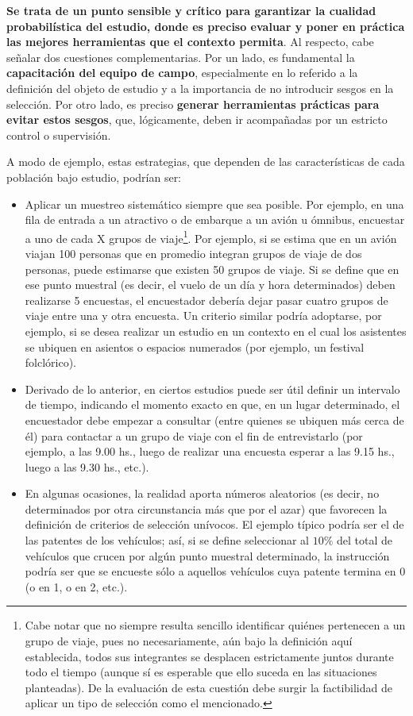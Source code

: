 \documentclass[
]{book}
\begin{document}
\textbf{Se trata de un punto sensible y crítico para garantizar la cualidad probabilística del estudio, donde es preciso evaluar y poner en práctica las mejores herramientas que el contexto permita}. Al respecto, cabe señalar dos cuestiones complementarias. Por un lado, es fundamental la \textbf{capacitación del equipo de campo}, especialmente en lo referido a la definición del objeto de estudio y a la importancia de no introducir sesgos en la selección. Por otro lado, es preciso \textbf{generar herramientas prácticas para evitar estos sesgos}, que, lógicamente, deben ir acompañadas por un estricto control o supervisión.

A modo de ejemplo, estas estrategias, que dependen de las características de cada población bajo estudio, podrían ser:

\begin{itemize}
\item
  Aplicar un muestreo sistemático siempre que sea posible. Por ejemplo, en una fila de entrada a un atractivo o de embarque a un avión u ómnibus, encuestar a uno de cada X grupos de viaje\footnote{Cabe notar que no siempre resulta sencillo identificar quiénes pertenecen a un grupo de viaje, pues no necesariamente, aún bajo la definición aquí establecida, todos sus integrantes se desplacen estrictamente juntos durante todo el tiempo (aunque sí es esperable que ello suceda en las situaciones planteadas). De la evaluación de esta cuestión debe surgir la factibilidad de aplicar un tipo de selección como el mencionado.}. Por ejemplo, si se estima que en un avión viajan 100 personas que en promedio integran grupos de viaje de dos personas, puede estimarse que existen 50 grupos de viaje. Si se define que en ese punto muestral (es decir, el vuelo de un día y hora determinados) deben realizarse 5 encuestas, el encuestador debería dejar pasar cuatro grupos de viaje entre una y otra encuesta. Un criterio similar podría adoptarse, por ejemplo, si se desea realizar un estudio en un contexto en el cual los asistentes se ubiquen en asientos o espacios numerados (por ejemplo, un festival folclórico).
\item
  Derivado de lo anterior, en ciertos estudios puede ser útil definir un intervalo de tiempo, indicando el momento exacto en que, en un lugar determinado, el encuestador debe empezar a consultar (entre quienes se ubiquen más cerca de él) para contactar a un grupo de viaje con el fin de entrevistarlo (por ejemplo, a las 9.00 hs., luego de realizar una encuesta esperar a las 9.15 hs., luego a las 9.30 hs., etc.).
\item
  En algunas ocasiones, la realidad aporta números aleatorios (es decir, no determinados por otra circunstancia más que por el azar) que favorecen la definición de criterios de selección unívocos. El ejemplo típico podría ser el de las patentes de los vehículos; así, si se define seleccionar al \(10\%\) del total de vehículos que crucen por algún punto muestral determinado, la instrucción podría ser que se encueste sólo a aquellos vehículos cuya patente termina en 0 (o en 1, o en 2, etc.).\\
\end{itemize}
\end{document}
